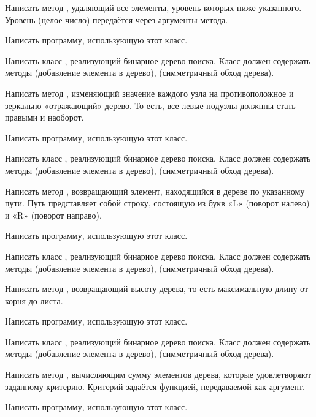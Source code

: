 Написать метод , удаляющий все элементы, уровень которых
ниже указанного. Уровень (целое число) передаётся через аргументы
метода.

Написать программу, использующую этот класс.

\task Написать класс , реализующий бинарное дерево
поиска. Класс должен содержать методы  (добавление элемента в
дерево),  (симметричный обход дерева).

Написать метод , изменяющий значение каждого узла на
противоположное и зеркально «отражающий» дерево. То есть, все
левые подузлы должнны стать правыми и наоборот.

Написать программу, использующую этот класс.

\task Написать класс , реализующий бинарное дерево
поиска. Класс должен содержать методы  (добавление элемента в
дерево),  (симметричный обход дерева).

Написать метод , возвращающий элемент, находящийся в
дереве по указанному пути. Путь представляет собой
строку, состоящую из букв «L» (поворот налево) и «R» (поворот
направо).

Написать программу, использующую этот класс.

\task Написать класс , реализующий бинарное дерево
поиска. Класс должен содержать методы  (добавление элемента в
дерево),  (симметричный обход дерева).

Написать метод , возвращающий высоту дерева, то есть
максимальную длину от корня до листа.

Написать программу, использующую этот класс.

\task Написать класс , реализующий бинарное дерево
поиска. Класс должен содержать методы  (добавление элемента в
дерево),  (симметричный обход дерева).

Написать метод , вычисляющим сумму элементов дерева, которые
удовлетворяют заданному критерию. Критерий задаётся функцией,
передаваемой как аргумент.

Написать программу, использующую этот класс.
